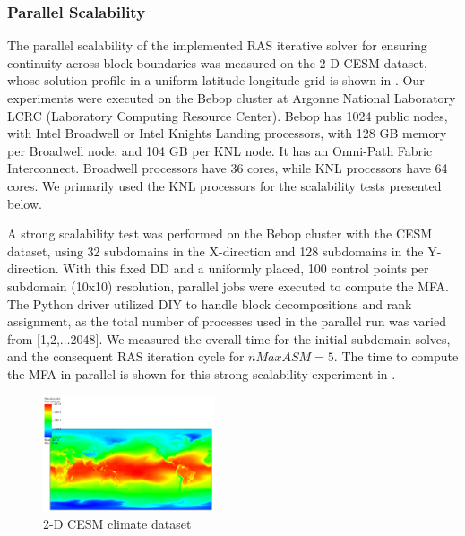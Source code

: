 

%



\subsubsection{Parallel Scalability}\label{sec:parallel-scalability}

The parallel scalability of the implemented RAS iterative solver for ensuring continuity across block boundaries was measured on the 2-D CESM dataset, whose solution profile in a uniform latitude-longitude grid is shown in . 
Our experiments were executed on the Bebop cluster at
Argonne National Laboratory LCRC (Laboratory Computing Resource Center). Bebop has 1024 public nodes, with Intel Broadwell or Intel Knights Landing processors, with 128 GB memory per Broadwell node, and 104 GB per KNL node. It has an Omni-Path Fabric Interconnect. Broadwell processors have 36 cores, while KNL processors have 64 cores. We primarily used the KNL processors for the scalability tests presented below.

A strong scalability test was performed on the Bebop cluster with the CESM dataset, using 32 subdomains in the X-direction and 128 subdomains in the Y-direction. With this fixed DD and a uniformly placed, 100 control points per subdomain (10x10) resolution, parallel jobs were executed to compute the MFA. The Python driver utilized DIY to handle block decompositions and rank assignment, as the total number of processes used in the parallel run was varied from [1,2,$\ldots$2048]. We measured the overall time for the initial subdomain solves, and the consequent RAS iteration cycle for $nMaxASM=5$. The time to compute the MFA in parallel is shown for this strong scalability experiment in .

\begin{figure}
	\includegraphics[width=0.45\textwidth]{figures/cesm-profile.png}
	\caption{2-D CESM climate dataset}
	\label{fig:cesm-2d-profile}
\end{figure}


